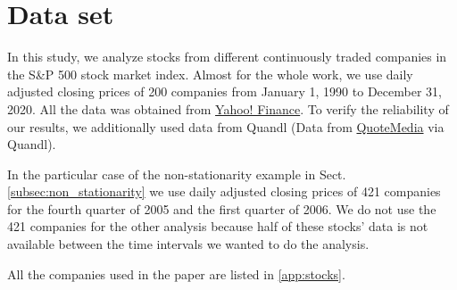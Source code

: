 \section{Data set}\label{sec:data_set}

In this study, we analyze stocks from different continuously traded companies
in the S\&P 500 stock market index. Almost for the whole work, we use daily
adjusted closing prices of 200 companies from January 1, 1990 to December 31,
2020. All the data was obtained from
\href{https://finance.yahoo.com/}{Yahoo! Finance}. To verify the reliability of
our results, we additionally used data from Quandl \cite{Quandl} (Data from
\href{https://www.quandl.com/}{QuoteMedia} \cite{QuoteMedia} via Quandl).

In the particular case of the non-stationarity example in Sect.
\ref{subsec:non_stationarity} we use daily adjusted closing prices of 421
companies for the fourth quarter of 2005 and the first quarter of 2006. We do
not use the 421 companies for the other analysis because half of these stocks'
data is not available between the time intervals we wanted to do the analysis.

All the companies used in the paper are listed in  \ref{app:stocks}.